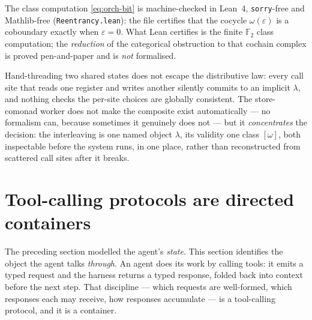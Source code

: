 \begin{remark}\label{rem:orch-lean}
The class computation \eqref{eq:orch-bit} is machine-checked in Lean~4, \texttt{sorry}-free and
Mathlib-free (\texttt{Reentrancy.lean}): the file certifies that the cocycle $\omega(\varepsilon)$ is
a coboundary exactly when $\varepsilon=0$. What Lean certifies is the finite $\mathbb{F}_2$ class
computation; the \emph{reduction} of the categorical obstruction to that cochain complex is proved
pen-and-paper and is \emph{not} formalised.
\end{remark}

\begin{remark}\label{rem:orch-threading}
Hand-threading two shared states does not escape the distributive law: every call site that reads one
register and writes another silently commits to an implicit $\lambda$, and nothing checks the per-site
choices are globally consistent. The store-comonad worker does not make the composite exist
automatically --- no formalism can, because sometimes it genuinely does not --- but it
\emph{concentrates} the decision: the interleaving is one named object $\lambda$, its validity one
class $[\omega]$, both inspectable before the system runs, in one place, rather than reconstructed
from scattered call sites after it breaks.
\end{remark}

\section{Tool-calling protocols are directed containers}\label{sec:orch-protocol}

The preceding section modelled the agent's \emph{state}. This section identifies the object the
agent talks \emph{through}. An agent does its work by calling tools: it emits a typed request and the
harness returns a typed response, folded back into context before the next step. That discipline ---
which requests are well-formed, which responses each may receive, how responses accumulate --- is a
tool-calling protocol, and it is a container.


